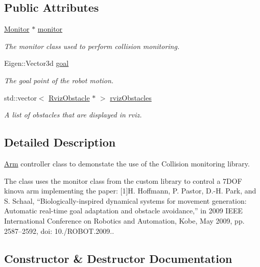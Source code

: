 \subsection*{Public Attributes}
\begin{DoxyCompactItemize}
\item 
\hyperlink{class_monitor}{Monitor} $\ast$ \hyperlink{class_base_controller_ae6cddbeb20a2a7f3f6b8c840aa59c063}{monitor}
\begin{DoxyCompactList}\small\item\em The monitor class used to perform collision monitoring. \end{DoxyCompactList}\item 
Eigen\+::\+Vector3d \hyperlink{class_base_controller_a48f4aa3cf599a55627b87d36d7b2c148}{goal}
\begin{DoxyCompactList}\small\item\em The goal point of the robot motion. \end{DoxyCompactList}\item 
std\+::vector$<$ \hyperlink{class_rviz_obstacle}{Rviz\+Obstacle} $\ast$ $>$ \hyperlink{class_base_controller_abb0f1c2c9cbd953d95268ff4cb7ff3b4}{rviz\+Obstacles}
\begin{DoxyCompactList}\small\item\em A list of obstacles that are displayed in rviz. \end{DoxyCompactList}\end{DoxyCompactItemize}


\subsection{Detailed Description}
\hyperlink{class_arm}{Arm} controller class to demonstate the use of the Collision monitoring library.

The class uses the monitor class from the custom library to control a 7\+D\+OF kinova arm implementing the paper\+: \mbox{[}1\mbox{]}H. Hoffmann, P. Pastor, D.-\/H. Park, and S. Schaal, “\+Biologically-\/inspired dynamical systems for movement generation\+: Automatic real-\/time goal adaptation and obstacle avoidance,” in 2009 I\+E\+EE International Conference on Robotics and Automation, Kobe, May 2009, pp. 2587–2592, doi\+: 10./\+R\+O\+B\+OT.2009.. 

\subsection{Constructor \& Destructor Documentation}
